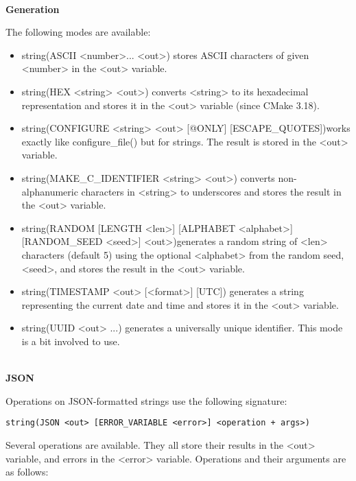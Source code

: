 \hspace*{\fill} \\ %
\noindent
\textbf{Generation}

The following modes are available:

\begin{itemize}
\item 
string(ASCII <number>... <out>) stores ASCII characters of given <number> in the <out> variable.

\item 
string(HEX <string> <out>) converts <string> to its hexadecimal representation and stores it in the <out> variable (since CMake 3.18).

\item 
string(CONFIGURE <string> <out> [@ONLY] [ESCAPE\_QUOTES])works exactly like configure\_file() but for strings. The result is stored in the <out> variable.

\item 
string(MAKE\_C\_IDENTIFIER <string> <out>) converts non-alphanumeric characters in <string> to underscores and stores the result in the <out> variable.

\item
string(RANDOM [LENGTH <len>] [ALPHABET <alphabet>] [RANDOM\_SEED <seed>] <out>)generates a random string of <len> characters (default 5) using the optional <alphabet> from the random seed, <seed>, and stores the result in the <out> variable.

\item
string(TIMESTAMP <out> [<format>] [UTC]) generates a string representing the current date and time and stores it in the <out> variable.

\item
string(UUID <out> ...) generates a universally unique identifier. This mode is a bit involved to use.
\end{itemize}

\hspace*{\fill} \\ %
\noindent
\textbf{JSON}

Operations on JSON-formatted strings use the following signature:

\begin{lstlisting}[style=styleCMake]
string(JSON <out> [ERROR_VARIABLE <error>] <operation + args>)
\end{lstlisting}

Several operations are available. They all store their results in the <out> variable, and errors in the <error> variable. Operations and their arguments are as follows:


